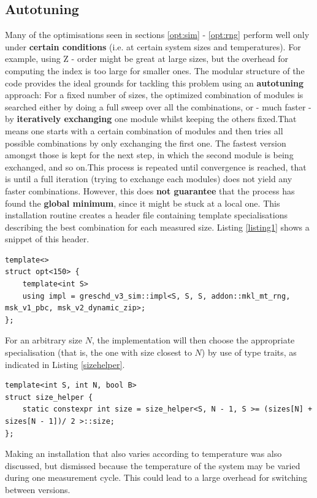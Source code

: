 \documentclass[letterpaper]{article}
\begin{document}
\subsection{Autotuning}\label{opt:autotuning}
Many of the optimisations seen in sections \ref{opt:sim} - \ref{opt:rng} perform well only under \textbf{certain conditions} (i.e. at certain system sizes and temperatures). For example, using Z - order might be great at large sizes, but the overhead for computing the index is too large for smaller ones. \newline
The modular structure of the code provides the ideal grounds for tackling this problem using an \textbf{autotuning} approach:\newline
For a fixed number of sizes, the optimized combination of modules is searched either by doing a full sweep over all the combinations, or - much faster - by \textbf{iteratively exchanging} one module whilst keeping the others fixed.\newline That means one starts with a certain combination of modules and then tries all possible combinations by only exchanging the first one. The fastest version amongst those is kept for the next step, in which the second module is being exchanged, and so on.\newline This process is repeated until convergence is reached, that is until a full iteration (trying to exchange each modules) does not yield any faster combinations. However, this does \textbf{not guarantee} that the process has found the \textbf{global minimum}, since it might be stuck at a local one.\newline 
This installation routine creates a header file containing template specialisations describing the best combination for each measured size. Listing \ref{listing1} shows a snippet of this header.\newline
\begin{lstlisting}[caption = {example for a template specialisation}, label = listing1]
template<>
struct opt<150> {
    template<int S>
    using impl = greschd_v3_sim::impl<S, S, S, addon::mkl_mt_rng, msk_v1_pbc, msk_v2_dynamic_zip>; 
};
\end{lstlisting}
For an arbitrary size $N$, the implementation will then choose the appropriate specialisation (that is, the one with size closest to $N$) by use of type traits, as indicated in Listing \ref{sizehelper}.
\begin{lstlisting}[label = sizehelper, caption = {size\_helper, part of the type traits}]
template<int S, int N, bool B>
struct size_helper {
    static constexpr int size = size_helper<S, N - 1, S >= (sizes[N] + sizes[N - 1])/ 2 >::size;
};
\end{lstlisting}
Making an installation that also varies according to temperature was also discussed, but dismissed because the temperature of the system may be varied during one measurement cycle. This could lead to a large overhead for switching between versions.
\end{document}
